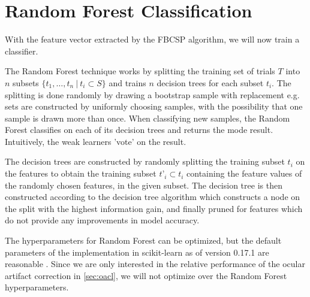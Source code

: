 \section{Random Forest Classification}\label{sec:randomforest}
With the feature vector extracted by the FBCSP algorithm, we will now train a classifier.

The Random Forest technique works by splitting the training set of trials $T$ into $n$ subsets $\{t_1,…,t_n \ | \ t_i \subset S\}$ and trains $n$ decision trees for each subset $t_i$. The splitting is done randomly by drawing a bootstrap sample with replacement e.g. sets are constructed by uniformly choosing samples, with the possibility that one sample is drawn more than once. When classifying new samples, the Random Forest classifies on each of its decision trees and returns the mode result. Intuitively, the weak learners 'vote' on the result.

The decision trees are constructed by randomly splitting the training subset $t_i$ on the features to obtain the training subset $t’_i \subset t_i$ containing the feature values of the randomly chosen features, in the given subset. The decision tree is then constructed according to the decision tree algorithm which constructs a node on the split with the highest information gain, and finally pruned for features which do not provide any improvements in model accuracy.

The hyperparameters for Random Forest can be optimized, but the default parameters of the implementation in scikit-learn \citep{scikit-learn} as of version 0.17.1 are reasonable \citep{bernard2009influence}. Since we are only interested in the relative performance of the ocular artifact correction in \cref{sec:oacl}, we will not optimize over the Random Forest hyperparameters.
